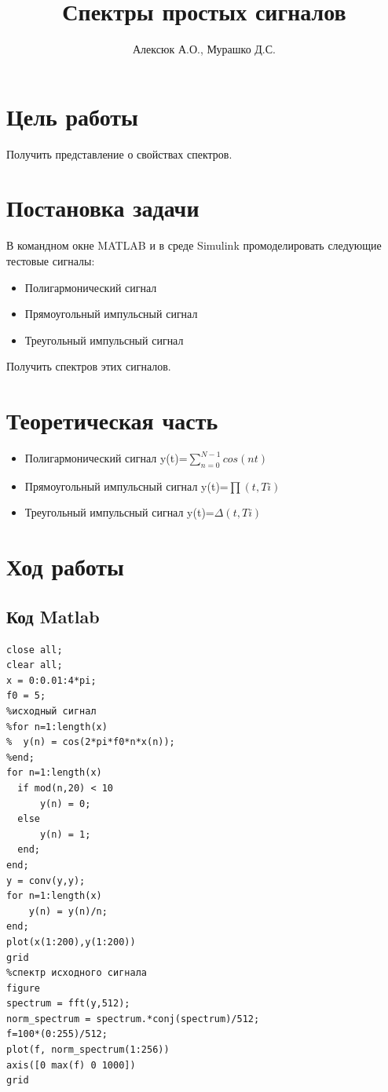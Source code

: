 \documentclass[a4paper, 12pt]{article}
\author{Алексюк А.О., Мурашко Д.С.}
\title{Спектры простых сигналов}
\begin{document}
\maketitle
\tableofcontents
\pagebreak

\section{Цель работы}
Получить представление о свойствах спектров.

\section{Постановка задачи}
В командном окне MATLAB и в среде Simulink промоделировать следующие тестовые сигналы:
\begin{itemize}
\item Полигармонический сигнал
\item Прямоугольный импульсный сигнал
\item Треугольный импульсный сигнал
\end{itemize}
Получить спектров этих сигналов.

\section{Теоретическая часть}
\begin{itemize}
\item Полигармонический сигнал y(t)=$\sum\limits_{n=0}^{N-1} cos (nt)$ \newline
\item Прямоугольный импульсный сигнал y(t)=$\prod(t,Ti)$ \newline
\item Треугольный импульсный сигнал y(t)=$\Delta(t,Ti)$
\end{itemize}
\section{Ход работы}

\subsection{Код Matlab}
\begin{lstlisting}
close all;
clear all;
x = 0:0.01:4*pi;
f0 = 5;
%исходный сигнал
%for n=1:length(x)
%  y(n) = cos(2*pi*f0*n*x(n));
%end;
for n=1:length(x)
  if mod(n,20) < 10
      y(n) = 0;
  else
      y(n) = 1;
  end;
end;
y = conv(y,y);
for n=1:length(x)
    y(n) = y(n)/n;
end;
plot(x(1:200),y(1:200))
grid
%спектр исходного сигнала
figure
spectrum = fft(y,512);
norm_spectrum = spectrum.*conj(spectrum)/512;
f=100*(0:255)/512;
plot(f, norm_spectrum(1:256))
axis([0 max(f) 0 1000])
grid

\end{lstlisting}
\end{document}
